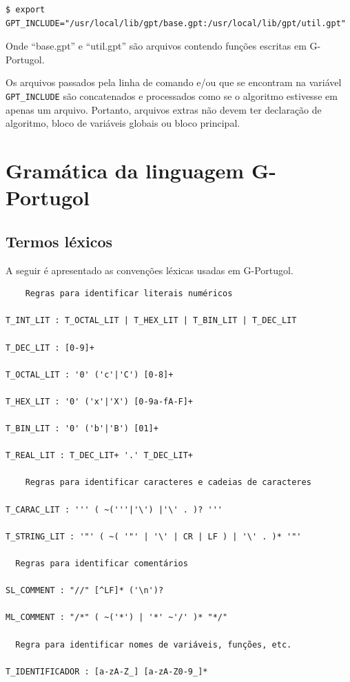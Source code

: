 \documentclass[a4paper,11pt]{report}
\begin{document}
\begin{verbatim}
$ export GPT_INCLUDE="/usr/local/lib/gpt/base.gpt:/usr/local/lib/gpt/util.gpt"
\end{verbatim}

Onde ``base.gpt'' e ``util.gpt'' são arquivos contendo funções escritas em
G-Portugol.

Os arquivos passados pela linha de comando e/ou que se encontram na variável
\nolinkurl{GPT\_INCLUDE} são concatenados e processados como se o algoritmo
estivesse em apenas um arquivo. Portanto, arquivos extras não devem ter
declaração de algoritmo, bloco de variáveis globais ou bloco principal.


\appendix

\chapter{Gramática da linguagem G-Portugol}

\section{Termos léxicos}

A seguir é apresentado as convenções léxicas usadas em G-Portugol.

\begin{verbatim}
    Regras para identificar literais numéricos

T_INT_LIT : T_OCTAL_LIT | T_HEX_LIT | T_BIN_LIT | T_DEC_LIT

T_DEC_LIT : [0-9]+

T_OCTAL_LIT : '0' ('c'|'C') [0-8]+

T_HEX_LIT : '0' ('x'|'X') [0-9a-fA-F]+

T_BIN_LIT : '0' ('b'|'B') [01]+

T_REAL_LIT : T_DEC_LIT+ '.' T_DEC_LIT+

    Regras para identificar caracteres e cadeias de caracteres

T_CARAC_LIT : ''' ( ~('''|'\') |'\' . )? '''

T_STRING_LIT : '"' ( ~( '"' | '\' | CR | LF ) | '\' . )* '"'

  Regras para identificar comentários

SL_COMMENT : "//" [^LF]* ('\n')?

ML_COMMENT : "/*" ( ~('*') | '*' ~'/' )* "*/"

  Regra para identificar nomes de variáveis, funções, etc.

T_IDENTIFICADOR : [a-zA-Z_] [a-zA-Z0-9_]*
\end{verbatim}
\end{document}
